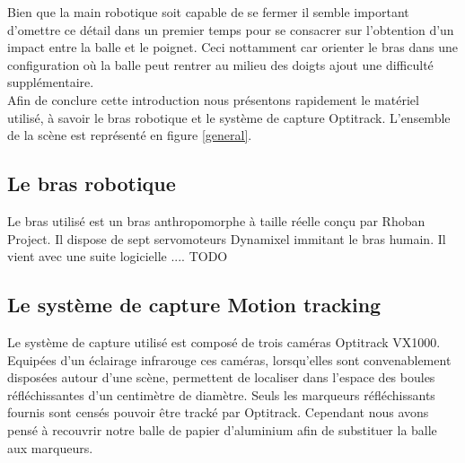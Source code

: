 \documentclass{article}[11pt]
\begin{document}
Bien que la main robotique soit capable de se fermer il semble important d'omettre ce détail dans un premier temps pour se consacrer sur l'obtention d'un impact entre la balle et le poignet. Ceci nottamment car orienter le bras dans une configuration où la balle peut rentrer au milieu des doigts ajout une difficulté supplémentaire. \\

Afin de conclure cette introduction nous présentons rapidement le matériel utilisé, à savoir le bras robotique et le système de capture Optitrack. L'ensemble de la scène est représenté en figure \ref{general}.

\subsection{Le bras robotique}

Le bras utilisé est un bras anthropomorphe à taille réelle conçu par Rhoban Project. Il dispose de sept servomoteurs Dynamixel immitant le bras humain. Il vient avec une suite logicielle .... TODO

\subsection{Le système de capture \og Motion tracking\fg}

Le système de capture utilisé est composé de trois caméras Optitrack VX1000. Equipées d'un éclairage infrarouge ces caméras, lorsqu'elles sont convenablement disposées autour d'une scène, permettent de localiser dans l'espace des boules réfléchissantes d'un centimètre de diamètre. Seuls les marqueurs réfléchissants fournis sont censés pouvoir être tracké par Optitrack. Cependant nous avons pensé à recouvrir notre balle de papier d'aluminium afin de substituer la balle aux marqueurs. \\
\end{document}
